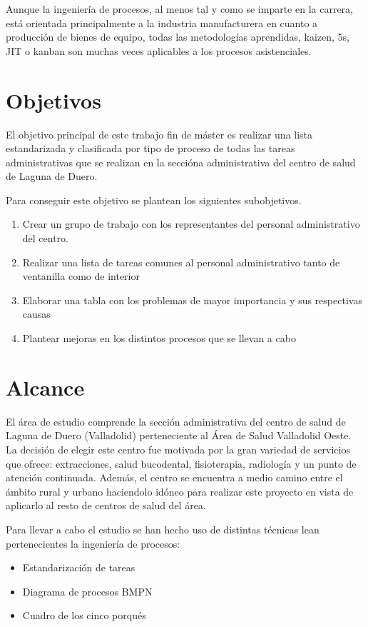 Aunque la ingeniería de procesos, al menos tal y como se imparte en la carrera, está orientada principalmente a la industria manufacturera en cuanto a producción de bienes de equipo, todas las metodologías aprendidas, kaizen, 5s, JIT o kanban son muchas veces aplicables a los procesos asistenciales.

\section{Objetivos}

El objetivo principal de este trabajo fin de máster es realizar una lista estandarizada y clasificada por tipo de proceso de todas las tareas administrativas que se realizan en la seccióna administrativa del centro de salud de Laguna de Duero.

Para conseguir este objetivo se plantean los siguientes subobjetivos.

\begin{enumerate}
    \item Crear un grupo de trabajo con los representantes del personal administrativo del centro.
    \item Realizar una lista de tareas comunes al personal administrativo tanto de ventanilla como de interior
    \item Elaborar una tabla con los problemas de mayor importancia y sus respectivas causas
    \item Plantear mejoras en los distintos procesos que se llevan a cabo
\end{enumerate}

\section{Alcance}

El área de estudio comprende la sección administrativa del centro de salud de Laguna de Duero (Valladolid) perteneciente al Área de Salud Valladolid Oeste. La decisión de elegir este centro fue motivada por la gran variedad de servicios que ofrece: extracciones, salud bucodental, fisioterapia, radiología y un punto de atención continuada. Además, el centro se encuentra a medio camino entre el ámbito rural y urbano haciendolo idóneo para realizar este proyecto en vista de aplicarlo al resto de centros de salud del área.

Para llevar a cabo el estudio se han hecho uso de distintas técnicas lean pertenecientes la ingeniería de procesos:

\begin{itemize}
    \item Estandarización de tareas
    \item Diagrama de procesos BMPN
    \item Cuadro de los cinco porqués
\end{itemize}


